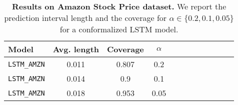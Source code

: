 \begin{table}[t] 
\centering 
\small 
\begin{tabular}{lccccccccccc} 
\toprule 
Model & Avg. length & Coverage & $ \alpha$ \\ 
\midrule 
\verb|LSTM_AMZN| & 0.011 & 0.807 & 0.2 \\ 
\verb|LSTM_AMZN| & 0.014 & 0.9 & 0.1 \\ 
\verb|LSTM_AMZN| & 0.018 & 0.953 & 0.05 \\ 
\bottomrule 
\end{tabular} 
\caption{\textbf{Results on Amazon Stock Price dataset.} We report the prediction interval length and the coverage for $\alpha \in \{ 0.2, 0.1, 0.05 \}$ for a conformalized LSTM model.} 
\label{table:amazon_stock_price.1} 
\end{table} 
